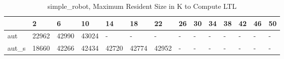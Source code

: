 \begin{table}
\caption{simple_robot, Maximum Resident Size in K to Compute LTL}
\label{simple_robot_LTL_size}
\begin{tabular}{llllllllllllll}
\toprule
 & 2 & 6 & 10 & 14 & 18 & 22 & 26 & 30 & 34 & 38 & 42 & 46 & 50 \\
\midrule
aut & 22962 & 42990 & 43024 & - & - & - & - & - & - & - & - & - & - \\
aut_s & 18660 & 42266 & 42434 & 42720 & 42774 & 42952 & - & - & - & - & - & - & - \\
\bottomrule
\end{tabular}
\end{table}
